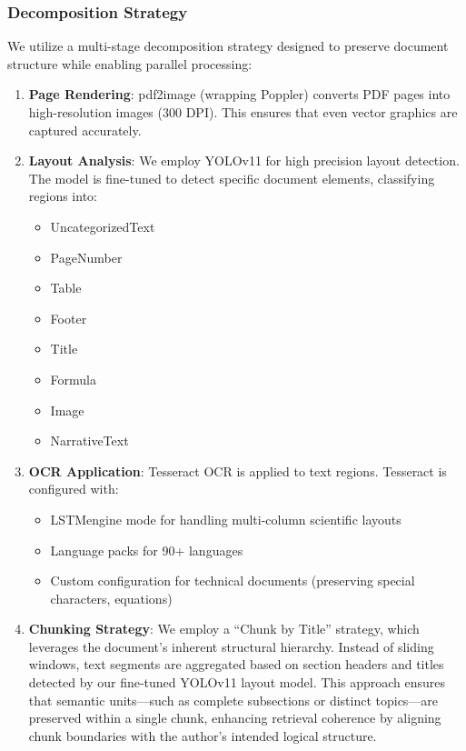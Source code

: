 \documentclass[conference]{IEEEtran}
\begin{document}
\subsubsection{Decomposition Strategy}
We utilize a multi-stage decomposition strategy designed to preserve document structure while enabling parallel processing:
\begin{enumerate}
    \item \textbf{Page Rendering}: pdf2image (wrapping Poppler) converts PDF pages into high-resolution images (300 DPI). This ensures that even vector graphics are captured accurately.
    \item \textbf{Layout Analysis}: We employ YOLOv11 for high precision layout detection. The model is fine-tuned to detect specific document elements, classifying regions into:
    \begin{itemize}
        \item UncategorizedText
        \item PageNumber
        \item Table
        \item Footer
        \item Title
        \item Formula
        \item Image
        \item NarrativeText
    \end{itemize}
    \item \textbf{OCR Application}: Tesseract OCR is applied to text regions. Tesseract is configured with:
    \begin{itemize}
        \item LSTMengine mode for handling multi-column scientific layouts
        \item Language packs for 90+ languages
        \item Custom configuration for technical documents (preserving special characters, equations)
    \end{itemize}
    \item \textbf{Chunking Strategy}: We employ a ``Chunk by Title'' strategy, which leverages the document's inherent structural hierarchy. Instead of sliding windows, text segments are aggregated based on section headers and titles detected by our fine-tuned YOLOv11 layout model. This approach ensures that semantic units—such as complete subsections or distinct topics—are preserved within a single chunk, enhancing retrieval coherence by aligning chunk boundaries with the author's intended logical structure.
\end{enumerate}
\end{document}
